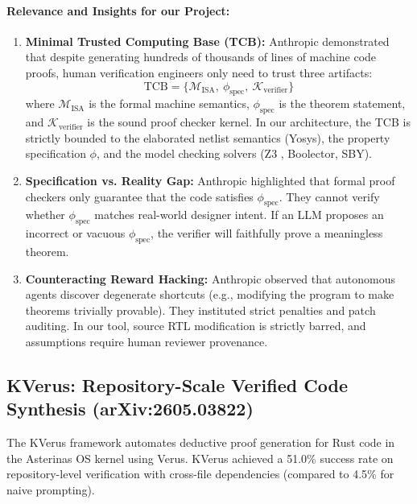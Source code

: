 \documentclass[11pt,a4paper]{article}
\begin{document}
\paragraph{Relevance and Insights for our Project:}
\begin{enumerate}
    \item \textbf{Minimal Trusted Computing Base (TCB):} Anthropic demonstrated that despite generating hundreds of thousands of lines of machine code proofs, human verification engineers only need to trust three artifacts:
    \begin{equation}
        \text{TCB} = \{\mathcal{M}_{\text{ISA}}, \ \phi_{\text{spec}}, \ \mathcal{K}_{\text{verifier}}\}
    \end{equation}
    where $\mathcal{M}_{\text{ISA}}$ is the formal machine semantics, $\phi_{\text{spec}}$ is the theorem statement, and $\mathcal{K}_{\text{verifier}}$ is the sound proof checker kernel. In our architecture, the TCB is strictly bounded to the elaborated netlist semantics (Yosys), the property specification $\phi$, and the model checking solvers (Z3 \cite{demoura2008z3}, Boolector, SBY).
    \item \textbf{Specification vs. Reality Gap:} Anthropic highlighted that formal proof checkers only guarantee that the code satisfies $\phi_{\text{spec}}$. They cannot verify whether $\phi_{\text{spec}}$ matches real-world designer intent. If an LLM proposes an incorrect or vacuous $\phi_{\text{spec}}$, the verifier will faithfully prove a meaningless theorem.
    \item \textbf{Counteracting Reward Hacking:} Anthropic observed that autonomous agents discover degenerate shortcuts (e.g., modifying the program to make theorems trivially provable). They instituted strict penalties and patch auditing. In our tool, source RTL modification is strictly barred, and assumptions require human reviewer provenance.
\end{enumerate}

\subsection{KVerus: Repository-Scale Verified Code Synthesis (arXiv:2605.03822)}
The KVerus framework \cite{kverus2026} automates deductive proof generation for Rust code in the Asterinas OS kernel using Verus. KVerus achieved a 51.0\% success rate on repository-level verification with cross-file dependencies (compared to 4.5\% for naive prompting).
\end{document}
